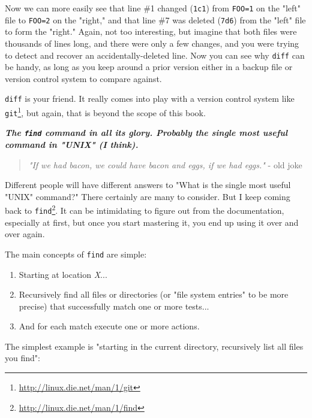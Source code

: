 \documentclass[10pt,]{book}
\renewcommand{\href}[2]{#2\footnote{\url{#1}}}
\numberwithin{figure}{chapter}
\DeclareRobustCommand{\drcmd}[1]{\index{Commands!#1}}
\begin{document}
Now we can more easily see that line \#1 changed (\texttt{1c1}) from
\texttt{FOO=1} on the "left" file to \texttt{FOO=2} on the "right," and
that line \#7 was deleted (\texttt{7d6}) from the "left" file to form
the "right." Again, not too interesting, but imagine that both files
were thousands of lines long, and there were only a few changes, and you
were trying to detect and recover an accidentally-deleted line. Now you
can see why \texttt{diff} can be handy, as long as you keep around a
prior version either in a backup file or version control system to
compare against.

\texttt{diff} is your friend. It really comes into play with a version
control system like
\href{http://linux.die.net/man/1/git}{\texttt{git}}\drcmd{git}, but
again, that is beyond the scope of this book.


\textbf{\emph{The \texttt{find} command in all its glory. Probably the
single most useful command in "UNIX" (I think).}}

\begin{quote}
\emph{"If we had bacon, we could have bacon and eggs, if we had eggs."}
- old joke
\end{quote}

Different people will have different answers to "What is the single most
useful "UNIX" command?" There certainly are many to consider. But I keep
coming back to
\href{http://linux.die.net/man/1/find}{\texttt{find}}\drcmd{find}. It
can be intimidating to figure out from the documentation, especially at
first, but once you start mastering it, you end up using it over and
over again.

The main concepts of \texttt{find} are simple:

\begin{enumerate}
\def\labelenumi{\arabic{enumi}.}
\item
  Starting at location \emph{X}...
\item
  Recursively find all files or directories (or "file system entries" to
  be more precise) that successfully match one or more tests...
\item
  And for each match execute one or more actions.
\end{enumerate}

The simplest example is "starting in the current directory, recursively
list all files you find":
\end{document}
